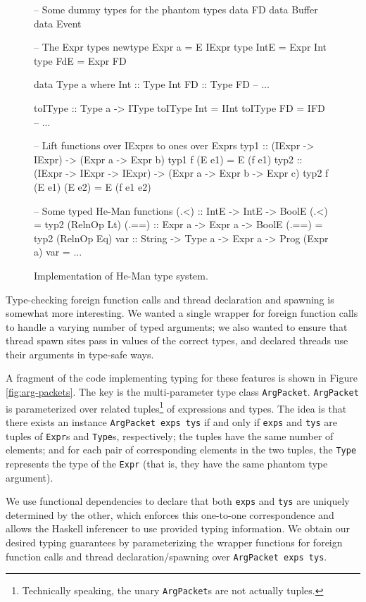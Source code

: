 \documentclass[preprint]{sigplanconf}
\renewcommand{\t}{\texttt}
\newenvironment{code}{\endgraf\small\verbatim}{\endverbatim}
\begin{document}
\begin{figure}[ht]
\centering
\begin{code}
-- Some dummy types for the phantom types
data FD
data Buffer
data Event

-- The Expr types
newtype Expr a = E IExpr
type IntE = Expr Int
type FdE = Expr FD

data Type a where
  Int :: Type Int
  FD :: Type FD
  -- ...

toIType :: Type a -> IType
toIType Int = IInt
toIType FD = IFD
-- ...

-- Lift functions over IExprs to ones over Exprs
typ1 :: (IExpr -> IExpr) -> (Expr a -> Expr b)
typ1 f (E e1) = E (f e1)
typ2 :: (IExpr -> IExpr -> IExpr) ->
        (Expr a -> Expr b -> Expr c)
typ2 f (E e1) (E e2) = E (f e1 e2)

-- Some typed He-Man functions
(.<) :: IntE -> IntE -> BoolE
(.<) = typ2 (RelnOp Lt)
(.==) :: Expr a -> Expr a -> BoolE
(.==) = typ2 (RelnOp Eq)
var :: String -> Type a -> Expr a -> Prog (Expr a)
var = ...
\end{code}
\caption{Implementation of He-Man type system.}
\label{fig:types}
\end{figure}

Type-checking foreign function calls and thread declaration and spawning is
somewhat more interesting. We wanted a single wrapper for foreign function calls
to handle a varying number of typed arguments; we also wanted to ensure that
thread spawn sites pass in values of the correct types, and declared threads use
their arguments in type-safe ways.

A fragment of the code implementing typing for these features is shown
in Figure \ref{fig:arg-packets}. The key is the multi-parameter type
class \t{ArgPacket}. \t{ArgPacket} is parameterized over related
tuples\footnote{Technically speaking, the unary \t{ArgPacket}s are
not actually tuples.} of expressions and types. The idea is that
there exists an instance \t{ArgPacket exps tys} if and only if
\t{exps} and \t{tys} are tuples of \t{Expr}s and \t{Type}s,
respectively; the tuples have the same number of elements; and for
each pair of corresponding elements in the two tuples, the \t{Type}
represents the type of the \t{Expr} (that is, they have the same
phantom type argument).

We use functional dependencies to declare that both \t{exps} and \t{tys} are
uniquely determined by the other, which enforces this one-to-one correspondence
and allows the Haskell inferencer to use provided typing information. We obtain
our desired typing guarantees by parameterizing the wrapper functions for
foreign function calls and thread declaration/spawning over \t{ArgPacket exps tys}.
\end{document}
